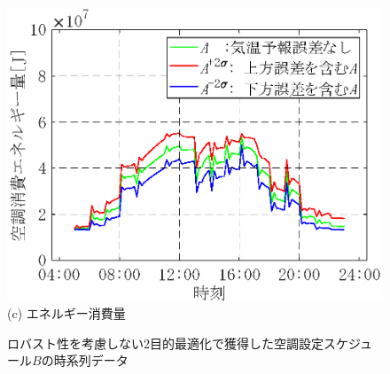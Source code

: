 \begin{figure}[htbp]
\begin{center}
\begin{minipage}{0.5\textwidth}
\begin{center}
            \end{center}
        \end{minipage}
        \begin{minipage}{0.5\textwidth}
            \begin{center}
                \includegraphics[width=1\textwidth,keepaspectratio=true]{fig/robust_result_schedule_2obj_power.eps}\\(c) エネルギー消費量
            \end{center}
        \end{minipage}
        \caption{ロバスト性を考慮しない2目的最適化で獲得した空調設定スケジュール$B$の時系列データ}
        \label{fig::robust_result_schedule_2obj}
    \end{center}
\end{figure}

